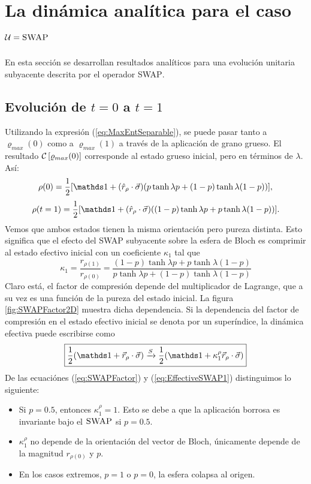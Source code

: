 \section{La dinámica analítica para el caso $\mathcal{U}=\textsc{SWAP}$}
En esta sección se desarrollan resultados analíticos para una evolución unitaria subyacente descrita por el operador \textsc{SWAP}.

\subsection{Evolución de $t=0$ a $t=1$}

Utilizando la expresión (\ref{eq:MaxEntSeparable}), se puede pasar tanto a $\varrho_{max}(0)$ como a $\varrho_{max}(1)$ a través de la aplicación de grano grueso. El resultado $\mathcal{C}\left[\varrho_{max}(0)\right]$ corresponde al estado grueso inicial, pero en términos de $\lambda$. Así:
\begin{equation}
\rho(0)=\frac{1}{2}[\Id+(\hat{r}_{\rho}\cdot\vec{\sigma})(p\tanh{\lambda p}+(1-p)\tanh{\lambda (1-p)})],
\end{equation}
\begin{equation}
\rho(t=1)=\frac{1}{2}[\Id+(\hat{r}_{\rho}\cdot\vec{\sigma})((1-p)\tanh{\lambda p}+p\tanh{\lambda (1-p)})].
\end{equation}
Vemos que ambos estados tienen la misma orientación pero pureza distinta. Esto significa que el efecto del \textsc{SWAP} subyacente sobre la esfera de Bloch es comprimir al estado efectivo inicial con un coeficiente $\kappa_{1}$ tal que
\begin{equation}\label{eq:SWAPFactor}
  \kappa_{1}=\frac{r_{\rho(1)}}{r_{\rho(0)}}=\frac{(1-p)\tanh{\lambda p}+p\tanh{\lambda (1-p)}}{
    p\tanh{\lambda p}+(1-p)\tanh{\lambda (1-p)}}
\end{equation}
Claro está, el factor de compresión depende del multiplicador de Lagrange, que a su vez es una función de la pureza del estado inicial. La figura \ref{fig:SWAPFactor2D} muestra dicha dependencia. Si la dependencia del factor de compresión en el estado efectivo inicial se denota por un superíndice, la dinámica efectiva puede escribirse como
\begin{equation}\label{eq:EffectiveSWAP1}
  \boxed{\frac{1}{2}(\Id+\vec{r}_{\rho}\cdot\vec{\sigma}) \xrightarrow{S} \frac{1}{2}(\Id+\kappa_{1}^{\rho}\vec{r}_{\rho}\cdot\vec{\sigma})}
\end{equation}
De las ecuaciónes (\ref{eq:SWAPFactor}) y (\ref{eq:EffectiveSWAP1}) distinguimos lo siguiente:
\begin{itemize}
  \item Si $p=0.5$, entonces $\kappa_{1}^{\rho}=1$. Esto se debe a que la aplicación borrosa es invariante bajo el $\textsc{SWAP}$ si $p=0.5$.
  \item $\kappa_{1}^{\rho}$ no depende de la orientación del vector de Bloch, únicamente depende de la magnitud $r_{\rho(0)}$ y $p$.
  \item En los casos extremos, $p=1$ o $p=0$, la esfera colapsa al origen.
\end{itemize}

